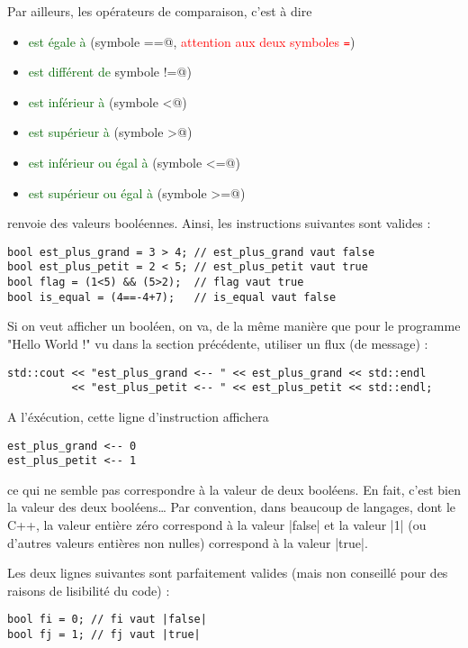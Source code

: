 Par ailleurs, les opérateurs de comparaison, c'est à dire
\begin{itemize}
  \item \textcolor{darkgreen}{est égale à} (symbole \verb@==@, \textcolor{red}{attention aux deux symboles \texttt{=}})
  \item \textcolor{darkgreen}{est différent de} {symbole \verb@!=@})
  \item \textcolor{darkgreen}{est inférieur à} (symbole \verb@<@)
  \item \textcolor{darkgreen}{est supérieur à} (symbole \verb@>@)
  \item \textcolor{darkgreen}{est inférieur ou égal à} (symbole \verb@<=@)
  \item \textcolor{darkgreen}{est supérieur ou égal à} (symbole \verb@>=@)
\end{itemize}
renvoie des valeurs booléennes. Ainsi, les instructions suivantes sont valides :
\begin{lstlisting}
bool est_plus_grand = 3 > 4; // est_plus_grand vaut false
bool est_plus_petit = 2 < 5; // est_plus_petit vaut true
bool flag = (1<5) && (5>2);  // flag vaut true
bool is_equal = (4==-4+7);   // is_equal vaut false
\end{lstlisting}

Si on veut afficher un booléen, on va, de la même manière que pour le programme "Hello World !" vu dans la section précédente,
utiliser un flux (de message) :
\begin{lstlisting}[caption=Exemple d'affichage basique d'un booléen]
std::cout << "est_plus_grand <-- " << est_plus_grand << std::endl
          << "est_plus_petit <-- " << est_plus_petit << std::endl;
\end{lstlisting}

A l'éxécution, cette ligne d'instruction affichera
\begin{verbatim}
est_plus_grand <-- 0
est_plus_petit <-- 1
\end{verbatim}

ce qui ne semble pas correspondre à la valeur de deux booléens. En fait, c'est bien la valeur des deux booléens\ldots 
Par convention, dans beaucoup de langages, dont le C++, la valeur entière zéro correspond à la valeur |false| et la valeur |1| (ou d'autres valeurs entières non nulles) correspond à la valeur |true|.

Les deux lignes suivantes sont parfaitement valides (mais non conseillé pour des raisons de lisibilité du code) :
\begin{lstlisting}
bool fi = 0; // fi vaut |false|
bool fj = 1; // fj vaut |true|
\end{lstlisting}


